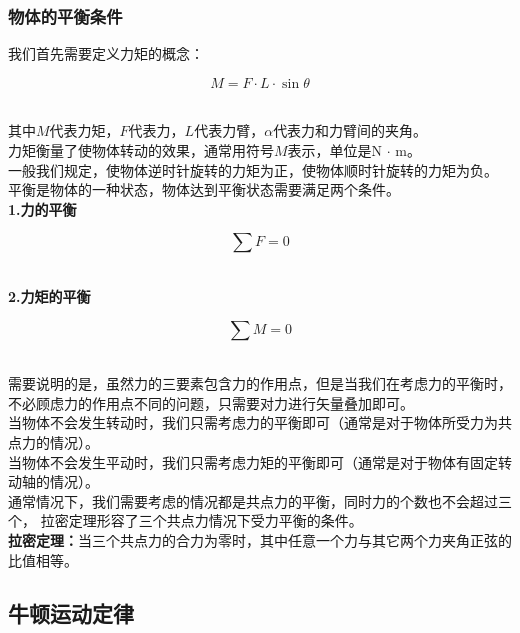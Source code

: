 \documentclass[UTF8]{ctexart}
\begin{document}
\subsubsection{物体的平衡条件}
    我们首先需要定义力矩的概念：
    \begin{large}
        \begin{equation*}
            M=F\cdot L\cdot\sin{\theta}
        \end{equation*}
    \end{large}\\
    其中$M$代表力矩，$F$代表力，$L$代表力臂，$\alpha$代表力和力臂间的夹角。\\[3mm]
    力矩衡量了使物体转动的效果，通常用符号$M$表示，单位是N $\cdot$ m。\\[1mm]
    一般我们规定，使物体逆时针旋转的力矩为正，使物体顺时针旋转的力矩为负。\\[6mm]
    平衡是物体的一种状态，物体达到平衡状态需要满足两个条件。\\[3mm]
    \textbf{1.力的平衡}
    \begin{large}
        \begin{equation*}
            \sum{F}=0
        \end{equation*}
    \end{large}\\
    \textbf{2.力矩的平衡}
    \begin{large}
        \begin{equation*}
            \sum{M}=0
        \end{equation*}
    \end{large}\\
    需要说明的是，虽然力的三要素包含力的作用点，但是当我们在考虑力的平衡时，
    不必顾虑力的作用点不同的问题，只需要对力进行矢量叠加即可。\\[2mm]
    当物体不会发生转动时，我们只需考虑力的平衡即可（通常是对于物体所受力为共点力的情况）。\\[2mm]
    当物体不会发生平动时，我们只需考虑力矩的平衡即可（通常是对于物体有固定转动轴的情况）。\\[3mm]
    通常情况下，我们需要考虑的情况都是共点力的平衡，同时力的个数也不会超过三个，
    拉密定理形容了三个共点力情况下受力平衡的条件。\\[2mm]
    \textbf{拉密定理：}当三个共点力的合力为零时，其中任意一个力与其它两个力夹角正弦的比值相等。

\newpage

\subsection{牛顿运动定律}
\end{document}
